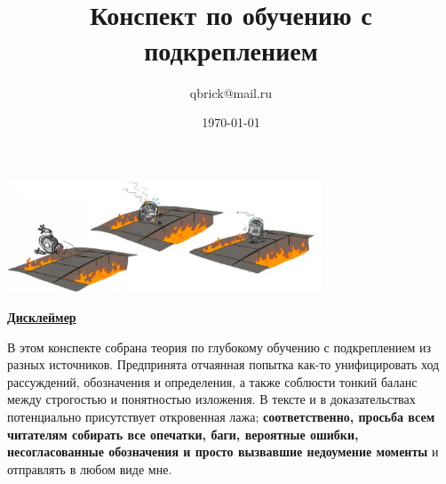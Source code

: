 \documentclass[a4paper, 10pt, oneside]{memoir}
\title{
\vspace{4cm}
\normalfont \normalsize 
\horrule{0.5pt} \\[0.4cm]
\huge Конспект по обучению с подкреплением
\horrule{2pt} \\[0.5cm]
}
\author{qbrick@mail.ru}
\date{\normalsize\today}
\begin{document}

\maketitle
\thispagestyle{empty}

\begin{center}
    \includegraphics[width=0.7\textwidth]{Images/robot.png}
\end{center}

\vspace{2cm}
\begin{center}
\textcolor{ChadBlue}{\underline{\textbf{Дисклеймер}}}
\end{center}

\vspace{0.75cm}
В этом конспекте собрана теория по глубокому обучению с подкреплением из разных источников. Предпринята отчаянная попытка как-то унифицировать ход рассуждений, обозначения и определения, а также соблюсти тонкий баланс между строгостью и понятностью изложения. В тексте и в доказательствах потенциально присутствует откровенная лажа; \textbf{соответственно, просьба всем читателям собирать все опечатки, баги, вероятные ошибки, несогласованные обозначения и просто вызвавшие недоумение моменты} и отправлять в любом виде мне.



\end{document}
